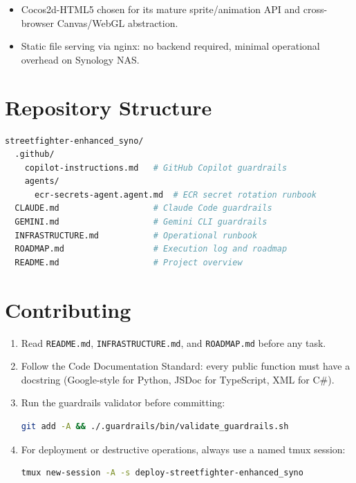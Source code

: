 \documentclass[11pt,a4paper]{article}
\begin{document}
\begin{itemize}
  \item Cocos2d-HTML5 chosen for its mature sprite/animation API
    and cross-browser Canvas/WebGL abstraction.
  \item Static file serving via nginx: no backend required,
    minimal operational overhead on Synology NAS.
\end{itemize}


\section{Repository Structure}
\begin{lstlisting}[language=bash,caption={Top-level directory layout}]
streetfighter-enhanced_syno/
  .github/
    copilot-instructions.md   # GitHub Copilot guardrails
    agents/
      ecr-secrets-agent.agent.md  # ECR secret rotation runbook
  CLAUDE.md                   # Claude Code guardrails
  GEMINI.md                   # Gemini CLI guardrails
  INFRASTRUCTURE.md           # Operational runbook
  ROADMAP.md                  # Execution log and roadmap
  README.md                   # Project overview
\end{lstlisting}

\section{Contributing}
\begin{enumerate}
  \item Read \texttt{README.md}, \texttt{INFRASTRUCTURE.md}, and \texttt{ROADMAP.md} before any task.
  \item Follow the Code Documentation Standard: every public function must have
    a docstring (Google-style for Python, JSDoc for TypeScript, XML for C\#).
  \item Run the guardrails validator before committing:
    \begin{lstlisting}[language=bash]
git add -A && ./.guardrails/bin/validate_guardrails.sh
    \end{lstlisting}
  \item For deployment or destructive operations, always use a named tmux session:
    \begin{lstlisting}[language=bash]
tmux new-session -A -s deploy-streetfighter-enhanced_syno
    \end{lstlisting}
\end{enumerate}
\end{document}
